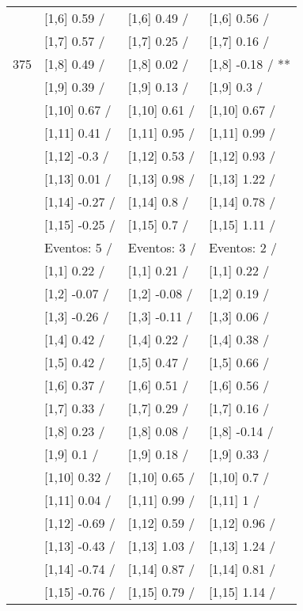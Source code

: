 \begin{table}
\begin{tabular}[t]{llll}
 & {}[1,6] 0.59  / & {}[1,6] 0.49  / & {}[1,6] 0.56  /\\
 & {}[1,7] 0.57  / & {}[1,7] 0.25  / & {}[1,7] 0.16  /\\
375 & {}[1,8] 0.49  / & {}[1,8] 0.02  / & {}[1,8] -0.18  / **\\
\addlinespace
 & {}[1,9] 0.39  / & {}[1,9] 0.13  / & {}[1,9] 0.3  /\\
 & {}[1,10] 0.67  / & {}[1,10] 0.61  / & {}[1,10] 0.67  /\\
 & {}[1,11] 0.41  / & {}[1,11] 0.95  / & {}[1,11] 0.99  /\\
 & {}[1,12] -0.3  / & {}[1,12] 0.53  / & {}[1,12] 0.93  /\\
 & {}[1,13] 0.01  / & {}[1,13] 0.98  / & {}[1,13] 1.22  /\\
\addlinespace
 & {}[1,14] -0.27  / & {}[1,14] 0.8  / & {}[1,14] 0.78  /\\
 & {}[1,15] -0.25  / & {}[1,15] 0.7  / & {}[1,15] 1.11  /\\
 & Eventos:  5 / & Eventos:  3 / & Eventos:  2 /\\
 & {}[1,1] 0.22  / & {}[1,1] 0.21  / & {}[1,1] 0.22  /\\
 & {}[1,2] -0.07  / & {}[1,2] -0.08  / & {}[1,2] 0.19  /\\
\addlinespace
 & {}[1,3] -0.26  / & {}[1,3] -0.11  / & {}[1,3] 0.06  /\\
 & {}[1,4] 0.42  / & {}[1,4] 0.22  / & {}[1,4] 0.38  /\\
 & {}[1,5] 0.42  / & {}[1,5] 0.47  / & {}[1,5] 0.66  /\\
 & {}[1,6] 0.37  / & {}[1,6] 0.51  / & {}[1,6] 0.56  /\\
 & {}[1,7] 0.33  / & {}[1,7] 0.29  / & {}[1,7] 0.16  /\\
\addlinespace
500 & {}[1,8] 0.23  / & {}[1,8] 0.08  / & {}[1,8] -0.14  /\\
 & {}[1,9] 0.1  / & {}[1,9] 0.18  / & {}[1,9] 0.33  /\\
 & {}[1,10] 0.32  / & {}[1,10] 0.65  / & {}[1,10] 0.7  /\\
 & {}[1,11] 0.04  / & {}[1,11] 0.99  / & {}[1,11] 1  /\\
 & {}[1,12] -0.69  / & {}[1,12] 0.59  / & {}[1,12] 0.96  /\\
\addlinespace
 & {}[1,13] -0.43  / & {}[1,13] 1.03  / & {}[1,13] 1.24  /\\
 & {}[1,14] -0.74  / & {}[1,14] 0.87  / & {}[1,14] 0.81  /\\
 & {}[1,15] -0.76  / & {}[1,15] 0.79  / & {}[1,15] 1.14  /\\
\bottomrule
\end{tabular}
\end{table}
